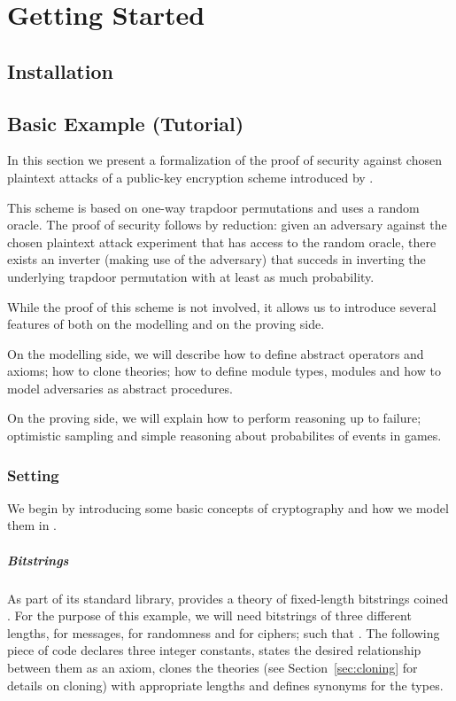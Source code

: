 
\chapter{Getting Started}
\section{Installation}

\section{Basic Example (Tutorial)\label{sec:tutorial}}
In this section we present a formalization of the proof of security
against chosen plaintext attacks of a public-key encryption scheme
introduced by \citet{br93}.

This scheme is based on one-way trapdoor permutations and uses a
random oracle. The proof of security follows by reduction: given an
adversary against the chosen plaintext attack experiment that has
access to the random oracle, there exists an inverter (making use of
the adversary) that succeds in inverting the underlying trapdoor
permutation with at least as much probability.

While the proof of this scheme is not involved, it allows us to
introduce several features of \EC both on the modelling and on
the proving side.

On the modelling side, we will describe how to define abstract operators
and axioms; how to clone theories; how to define module types, modules
and how to model adversaries as abstract procedures.

On the proving side, we will explain how to perform reasoning up to
failure; optimistic sampling and simple reasoning about probabilites
of events in games.

\subsection{Setting}
We begin by introducing some basic concepts of cryptography and how we
model them in \EC.

\paragraph{Bitstrings}
As part of its standard library, \EC provides a theory of fixed-length
bitstrings coined . For the purpose of this example, we will
need bitstrings of three different lengths,  for messages,
 for randomness and  for ciphers; such that . The following piece of code declares three integer constants,
states the desired relationship between them as an axiom, clones the
theories (see Section~\ref{sec:cloning} for details on cloning) with
appropriate lengths and defines synonyms for the types.

